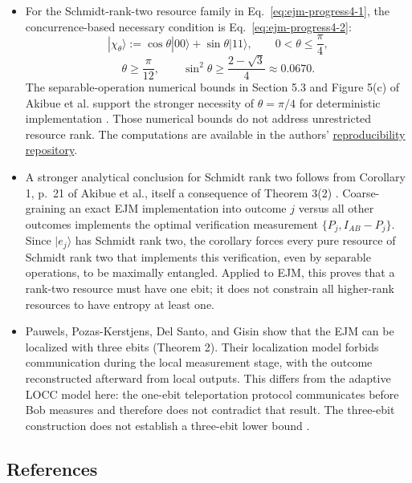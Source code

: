 \begin{itemize}
  \item For the Schmidt-rank-two resource family in Eq.~\eqref{eq:ejm-progress4-1}, the concurrence-based necessary condition is Eq.~\eqref{eq:ejm-progress4-2}:
\begin{equation}
|\chi_\theta\rangle:=\cos\theta|00\rangle+\sin\theta|11\rangle,
\qquad0<\theta\leq\frac\pi4,
\label{eq:ejm-progress4-1}
\end{equation}
\begin{equation}
\theta\geq\frac\pi{12},\qquad
\sin^2\theta\geq\frac{2-\sqrt3}{4}\approx0.0670.
\label{eq:ejm-progress4-2}
\end{equation}
The separable-operation numerical bounds in Section 5.3 and Figure 5(c) of Akibue et al. support the stronger necessity of $\theta=\pi/4$ for deterministic implementation . Those numerical bounds do not address unrestricted resource rank. The computations are available in the authors' \href{https://github.com/akibue/DPS-based-on-MFLE}{reproducibility repository}.

  \item A stronger analytical conclusion for Schmidt rank two follows from Corollary 1, p.~21 of Akibue et al., itself a consequence of Theorem 3(2) . Coarse-graining an exact EJM implementation into outcome $j$ versus all other outcomes implements the optimal verification measurement $\{P_j,I_{AB}-P_j\}$. Since $|e_j\rangle$ has Schmidt rank two, the corollary forces every pure resource of Schmidt rank two that implements this verification, even by separable operations, to be maximally entangled. Applied to EJM, this proves that a rank-two resource must have one ebit; it does not constrain all higher-rank resources to have entropy at least one.

  \item Pauwels, Pozas-Kerstjens, Del Santo, and Gisin show that the EJM can be localized with three ebits (Theorem 2). Their localization model forbids communication during the local measurement stage, with the outcome reconstructed afterward from local outputs. This differs from the adaptive LOCC model here: the one-ebit teleportation protocol communicates before Bob measures and therefore does not contradict that result. The three-ebit construction does not establish a three-ebit lower bound .
\end{itemize}

\subsection*{References}


